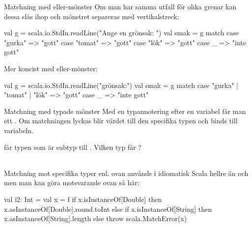\begin{Slide}{Matchning med eller-mönster}\SlideFontSmall
Om man har samma utfall för olika grenar kan dessa slås ihop och mönstret separeras med vertikalstreck: \code{|}
\begin{Code}
val g = scala.io.StdIn.readLine("Ange en grönsak: ")
val smak = g match 
  case "gurka" => "gott"
  case "tomat" => "gott"
  case "lök"   => "gott"
  case _ => "inte gott"
\end{Code}

Mer koncist med eller-mönster:

\begin{Code}
val g = scala.io.StdIn.readLine("grönsak:")
val smak = g match 
  case "gurka" | "tomat" | "lök" => "gott"
  case _ => "inte gott"
\end{Code}



\end{Slide}





\begin{Slide}{Matchning med typade mönster}\SlideFontSmall
Med en typannotering efter en variabel får man ett  . Om matchningen lyckas blir värdet  till den specifika typen och binds till variabeln.
 får typen  som är subtyp till . Vilken typ får ? \pause ~~
{\SlideFontTiny \\\vspace{0.5em} Matchning mot specifika typer enl. ovan används i idiomatisk Scala hellre än  och  men man kan göra motsvarande ovan så här:
\begin{Code}
val i2: Int =  
  val x = f
  if x.isInstanceOf[Double] then x.asInstanceOf[Double].round.toInt
  else if x.isInstanceOf[String] then x.asInstanceOf[String].length
  else throw scala.MatchError(x)
\end{Code}
}
\end{Slide}

